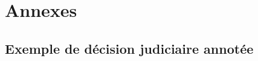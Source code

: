 \appendix
\renewcommand\thesection{A.\roman{section}}
\renewcommand\thefigure{A.\arabic{figure}}
\renewcommand\thetable{A.\arabic{table}}
\chapter*{Annexes}
\section{Exemple de décision judiciaire annotée}
\label{appendix:exemple-decision}
